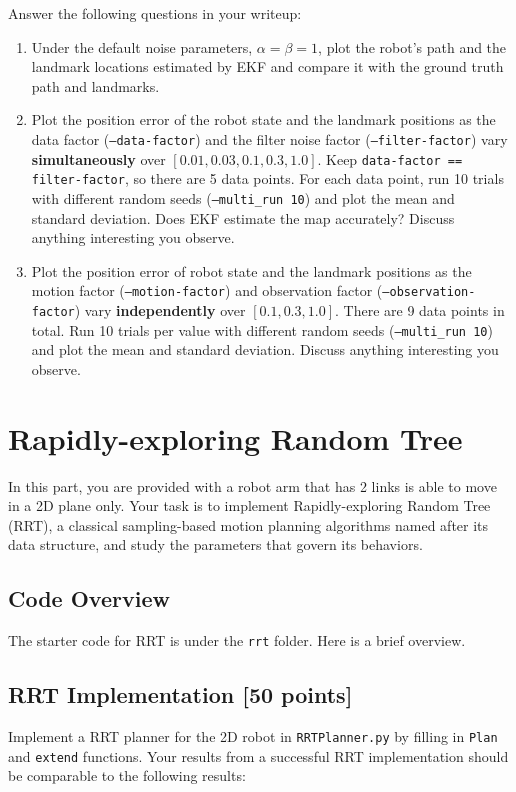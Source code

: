 \documentclass{article}
\begin{document}
Answer the following questions in your writeup:
\begin{enumerate}[label=(\alph*)]
    \item Under the default noise parameters, $\alpha=\beta=1$, plot the robot's path and the landmark locations estimated by EKF and compare it with the ground truth path and landmarks.
    \item Plot the position error of the robot state and the landmark positions as the data factor (\texttt{--data-factor}) and the filter noise factor (\texttt{--filter-factor}) vary \textbf{simultaneously} over $[0.01,0.03,0.1,0.3,1.0]$. Keep \texttt{data-factor == filter-factor}, so there are 5 data points. For each data point, run 10 trials with different random seeds (\texttt{--multi\_run 10}) and plot the mean and standard deviation. Does EKF estimate the map accurately? Discuss anything interesting you observe.
    \item Plot the position error of robot state and the landmark positions as the motion factor (\texttt{--motion-factor}) and observation factor (\texttt{--observation-factor}) vary \textbf{independently} over $[0.1,0.3,1.0]$. There are 9 data points in total. Run 10 trials per value with different random seeds (\texttt{--multi\_run 10}) and plot the mean and standard deviation. Discuss anything interesting you observe.
\end{enumerate}

\section{Rapidly-exploring Random Tree}
In this part, you are provided with a robot arm that has 2 links is able to move in a 2D plane only. Your task is to implement Rapidly-exploring Random Tree (RRT), a classical sampling-based motion planning algorithms named after its data structure, and study the parameters that govern its behaviors.

\subsection{Code Overview}
The starter code for RRT is under the \texttt{rrt} folder. Here is a brief overview.

\subsection{RRT Implementation [50 points]}
Implement a RRT planner for the 2D robot in \texttt{RRTPlanner.py} by filling in \texttt{Plan} and \texttt{extend} functions. Your results from a successful RRT implementation should be comparable to the following results:
\end{document}
